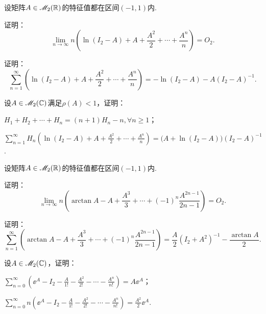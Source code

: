 \begin{mybox}
  \begin{problem}[一个对数级数的截尾求和.]

    设矩阵$A\in\mathscr M_2(\mathbb R)$的特征值都在区间$(-1,1)$内.
    \begin{enum}
      \item\label{prob4.67a} 证明：
      \[
        \lim_{n\to\infty}n\left( \ln(I_2-A) + A + \frac{A^2}2 + \cdots + \frac{A^n}n \right) = O_2.
      \]
      \item\label{prob4.67b} 证明：
      \[
        \sum_{n=1}^\infty \left( \ln(I_2-A) + A + \frac{A^2}2 + \cdots + \frac{A^n}n \right) = - \ln(I_2-A) - A(I_2-A)^{-1}.
      \]
    \end{enum}
  \end{problem}
\end{mybox}

\begin{mybox}
  \begin{problem}[对数级数与调和数.]

    设$A\in\mathscr M_2(\mathbb C)$满足$\rho(A)<1$，证明：
    \begin{enum}
      \item $H_1+H_2+\cdots+H_n=(n+1)H_n-n,\forall n\ge1$；
      \item $\sum_{n=1}^\infty H_n\left( \ln(I_2-A) + A + \frac{A^2}2 + \cdots + \frac{A^n}n \right) = \big( A+\ln(I_2-A) \big)(I_2-A)^{-1}$.
    \end{enum}
  \end{problem}
\end{mybox}

\begin{mybox}
  \begin{problem}[一个反正切级数]

    设矩阵$A\in\mathscr M_2(\mathbb R)$的特征值都在区间$(-1,1)$内.
    \begin{enum}
      \item 证明：
      \[
        \lim_{n\to\infty}n\left( \arctan A - A + \frac{A^3}3 + \cdots + (-1)^n\frac{A^{2n-1}}{2n-1} \right) = O_2.
      \]
      \item 证明：
      \[
        \sum_{n=1}^\infty \left( \arctan A - A + \frac{A^3}3 + \cdots + (-1)^n\frac{A^{2n-1}}{2n-1} \right) = \frac A2(I_2+A^2)^{-1} - \frac{\arctan A}2.
      \]
    \end{enum}
  \end{problem}
\end{mybox}

\begin{mybox}
  \begin{problem}[$\ee^A$的截尾求和.]

    设$A\in\mathscr M_2(\mathbb C)$，证明：
    \begin{enum}
      \item\label{prob4.70a} $\sum_{n=0}^\infty \left( \ee^A - I_2 - \frac A{1!} - \frac{A^2}{2!} - \cdots - \frac{A^n}{n!}\right)=A\ee^A$；
      \item $\sum_{n=0}^\infty n\left( \ee^A - I_2 - \frac A{1!} - \frac{A^2}{2!} - \cdots - \frac{A^n}{n!}\right)=\frac{A^2}2\ee^A$.
    \end{enum}
  \end{problem}
\end{mybox}

